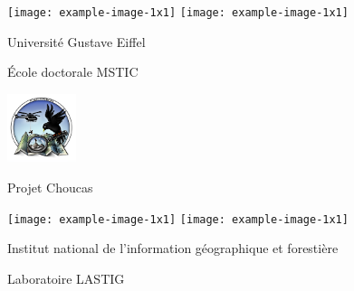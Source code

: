 \begin{titlepage}
  \centering

  \begin{minipage}[t]{.95\textwidth}
    \hspace{.1cm}
    \begin{minipage}[t]{5cm}
      \centering
      \texttt{[image: example-image-1x1]}
      \texttt{[image: example-image-1x1]}
      \par
      {\scriptsize
        Université Gustave Eiffel\par
        École doctorale MSTIC
      }
    \end{minipage}
    \hfill
    \begin{minipage}[t]{2.5cm}
      \centering
      \includegraphics[width=2cm]{./figures/logo-choucas.png}
      \par
      {\scriptsize Projet Choucas}
    \end{minipage}
    \hfill
    \begin{minipage}[t]{5cm}
      \centering
      \texttt{[image: example-image-1x1]}
      \texttt{[image: example-image-1x1]}
      \par
      {\scriptsize
        Institut national de l'information géographique et forestière\par
        Laboratoire LASTIG
      }
    \end{minipage}
    \hspace{.1cm}
  \end{minipage}
  \par

\end{titlepage}
